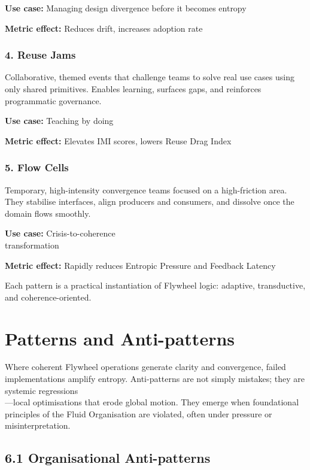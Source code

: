 \documentclass[12pt]{article}
\begin{document}
\textbf{Use case:} Managing design divergence before it becomes entropy

\textbf{Metric effect:} Reduces drift, increases adoption rate

\subsubsection*{4. Reuse Jams}

Collaborative, themed events that challenge teams to solve real use cases using only shared primitives. Enables learning, surfaces gaps, and reinforces programmatic governance.

\textbf{Use case:} Teaching by doing

\textbf{Metric effect:} Elevates IMI scores, lowers Reuse Drag Index

\subsubsection*{5. Flow Cells}

Temporary, high-intensity convergence teams focused on a high-friction area. They stabilise interfaces, align producers and consumers, and dissolve once the domain flows smoothly.

\textbf{Use case:} Crisis-to-coherence \\
transformation

\textbf{Metric effect:} Rapidly reduces Entropic Pressure and Feedback Latency

\vspace{1em}
Each pattern is a practical instantiation of Flywheel logic: adaptive, transductive, and coherence-oriented.

\section{Patterns and Anti-patterns}

Where coherent Flywheel operations generate clarity and convergence, failed implementations amplify entropy. Anti-patterns are not simply mistakes; they are systemic regressions\\---local optimisations that erode global motion. They emerge when foundational principles of the Fluid Organisation are violated, often under pressure or misinterpretation.

\subsection*{6.1 Organisational Anti-patterns}
\end{document}
